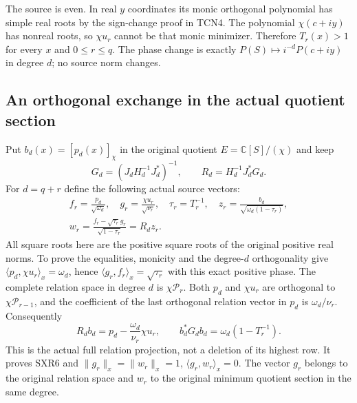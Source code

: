 The source is even. In real $y$ coordinates its monic orthogonal
polynomial has simple real roots by the sign-change proof in TCN4.
The polynomial $\chi(c+iy)$ has nonreal roots, so $\chi u_r$ cannot
be that monic minimizer. Therefore $T_r(x)>1$ for every $x$ and
$0\le r\le q$. The phase change is exactly
$P(S)\mapsto i^{-d}P(c+iy)$ in degree $d$; no source norm changes.

\subsection{An orthogonal exchange in the actual quotient section}

Put $b_d(x)=[p_d(x)]_\chi$ in the original quotient
$E=\mathbb C[S]/(\chi)$ and keep
\[
 G_d=(J_dH_d^{-1}J_d^*)^{-1},\qquad R_d=H_d^{-1}J_d^*G_d.
\]
For $d=q+r$ define the following actual source vectors:
\begin{equation}\tag{SXR6}
\begin{gathered}
 f_r=\frac{p_d}{\sqrt{\omega_d}},\quad
 g_r=\frac{\chi u_r}{\sqrt{\nu_r}},\quad
 \tau_r=T_r^{-1},\quad
 z_r=\frac{b_d}{\sqrt{\omega_d(1-\tau_r)}},\\
 w_r=\frac{f_r-\sqrt{\tau_r}g_r}{\sqrt{1-\tau_r}}
           =R_d z_r.
\end{gathered}
\end{equation}
All square roots here are the positive square roots of the original
positive real norms. To prove the equalities, monicity and the
degree-$d$ orthogonality give
$\langle p_d,\chi u_r\rangle_x=\omega_d$, hence
$\langle g_r,f_r\rangle_x=\sqrt{\tau_r}$ with this exact positive
phase. The complete relation space in degree $d$ is
$\chi\mathcal P_r$. Both $p_d$ and $\chi u_r$ are orthogonal to
$\chi\mathcal P_{r-1}$, and the coefficient of the last orthogonal
relation vector in $p_d$ is $\omega_d/\nu_r$. Consequently
\begin{equation}\tag{SXR7}
 R_db_d=p_d-\frac{\omega_d}{\nu_r}\chi u_r,
 \qquad b_d^*G_db_d=\omega_d(1-T_r^{-1}).
\end{equation}
This is the actual full relation projection, not a deletion of its
highest row. It proves SXR6 and
$\|g_r\|_x=\|w_r\|_x=1$, $\langle g_r,w_r\rangle_x=0$.
The vector $g_r$ belongs to the original relation space and $w_r$
to the original minimum quotient section in the same degree.


